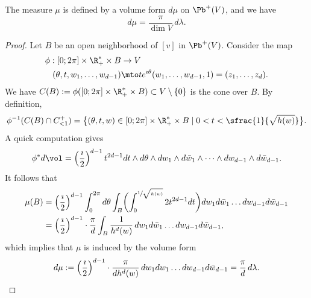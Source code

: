 \begin{Lemma}\label{lm:pushed:vol:form}
The measure $\mu$ is defined by a volume form $d\mu$ on $\Pb^+(V)$, and we have
\[
d\mu=\frac{\pi}{\dim V}\,d\lambda.
\]
\end{Lemma}
\begin{proof}
Let $B$ be an open neighborhood of $[v]$ in $\Pb^+(V)$. Consider the map
\begin{align*}
\phi: [0;2\pi]\times\R_+^*\times B & \to V\\
 (\theta,t,w_1,\dots,w_{d-1}) & \mto te^{\imath\theta}(w_1,\dots,w_{d-1},1)=(z_1,\dots,z_d).
\end{align*}
We have $C(B):=\phi([0;2\pi]\times\R^*_+\times B)\subset V\setminus\{0\}$ is the cone over $B$. By definition,
\[
\phi^{-1}(C(B)\cap C^+_{<1})=\bigl\{(\theta,t,w) \in [0;2\pi]\times\R_+^*\times B\mid 0< t < \sfrac{1}{\sqrt{h(w)}}\bigr\}.
\]
A quick computation gives
\[
\phi^*d\vol=\left(\frac{\imath}{2}\right)^{d-1} t^{2d-1}dt\wedge d\theta\wedge dw_1\wedge d\bar{w}_1\wedge\dots\wedge dw_{d-1}\wedge d\bar{w}_{d-1}.
\]
It follows that
\begin{align*}
\mu(B)&= \left(\frac{\imath}{2}\right)^{d-1} \int_0^{2\pi}d\theta \int_B \biggl(\int_0^{\sfrac{1}{\sqrt{h(w)}}} 2t^{2d-1}dt\biggr) dw_1d\bar{w}_1\dots dw_{d-1}d\bar{w}_{d-1}\\
&= \left(\frac{\imath}{2}\right)^{d-1}\cdot\frac{\pi}{d}\int_B \frac{1}{h^{d}(w)}\,dw_1d\bar{w}_1\dots dw_{d-1}d\bar{w}_{d-1},
\end{align*}
which implies that $\mu$ is induced by the volume form
\[
d\mu:=\left(\frac{\imath}{2}\right)^{d-1}\cdot\frac{\pi}{dh^d(w)}\,dw_1dw_1\dots dw_{d-1}d\bar{w}_{d-1}=\frac{\pi}{d}\,d\lambda.\qedhere
\]
\end{proof}

